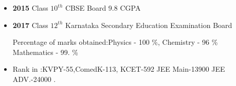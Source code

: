 \begin{itemize}
    \item \textbf{2015}  Class $10^{th}$  CBSE Board  9.8 CGPA 
    \item \textbf{2017} Class $12^{th}$ Karnataka Secondary Education Examination Board
    
    
 Percentage of marks obtained:Physics - 100 \%,  Chemistry - 96 \% Mathematics - 99. \%
\item Rank in :KVPY-55,ComedK-113, KCET-592 JEE Main-13900 JEE ADV.-24000 .
\end{itemize}

